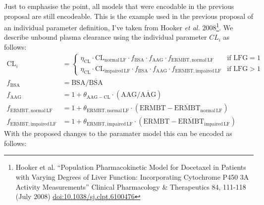 \documentclass[a4paper,11pt]{article}
\begin{document}
Just to emphasise the point, all models that were encodable in the
previous proposal are still encodeable. This is the example used in
the previous proposal of an individual parameter definition,
I've taken from Hooker \emph{et al.} 2008\footnote{ Hooker
  et al. ``Population Pharmacokinetic Model for Docetaxel in Patients
  with Varying Degrees of Liver Function: Incorporating Cytochrome
  P450 3A Activity Measurements'' Clinical Pharmacology \& Therapeutics
  84, 111-118 (July 2008) \textbar
  \url{doi:10.1038/sj.clpt.6100476}}. We describe unbound plasma
clearance using the individual parameter $\mathit{CL}_i$ as follows:
%
\begin{align*}
\mathrm{CL}_i &=
\begin{cases}
\eta_{\mathrm{CL}} \cdot \mathrm{CL}_{\mathrm{normal\, LF}} \cdot f_{\mathrm{BSA}} \cdot
f_{\mathrm{AAG}} \cdot f_{\mathrm{ERMBT, normal\, LF}} & \text{if } \mathrm{LFG} = 1\\
\eta_{\mathrm{CL}} \cdot \mathrm{CL}_{\mathrm{impaired\, LF}} \cdot f_{\mathrm{BSA}} \cdot
f_{\mathrm{AAG}} \cdot f_{\mathrm{ERMBT, impaired\, LF}} & \text{if } \mathrm{LFG}
> 1
\end{cases}\\
f_{\mathrm{BSA}} &= \mathrm{BSA} / \overline{\mathrm{BSA}}\\
f_{\mathrm{AAG}} &= 1 + \theta_{\mathrm{AAG-CL}} \cdot \left(\mathrm{AAG} / \overline{\mathrm{AAG}}\right)\\
f_{\mathrm{ERMBT, normal\, LF}} &= 1 + \theta_{\mathrm{ERMBT, normal\, LF}} \cdot
\left(\mathrm{ERMBT} - \overline{\mathrm{ERMBT}}_{\mathrm{normal\, LF}}\right)\\
f_{\mathrm{ERMBT, impaired\, LF}} &= 1 + \theta_{\mathrm{ERMBT, impaired\, LF}} \cdot
\left(\mathrm{ERMBT} - \overline{\mathrm{ERMBT}}_{\mathrm{impaired\, LF}}\right)
\end{align*}
%
With the proposed changes to the paramater model this can be encoded
as follows:
%
\end{document}
